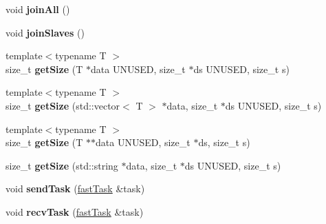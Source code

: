 \begin{DoxyCompactItemize}
\item 
\hypertarget{classfaster_1_1fastComm_aac7379b26c334d31e856c2e2b8ce2595}{}void {\bfseries join\+All} ()\label{classfaster_1_1fastComm_aac7379b26c334d31e856c2e2b8ce2595}

\item 
\hypertarget{classfaster_1_1fastComm_ac47594d479e9c0bce774644a32c23869}{}void {\bfseries join\+Slaves} ()\label{classfaster_1_1fastComm_ac47594d479e9c0bce774644a32c23869}

\item 
\hypertarget{classfaster_1_1fastComm_a44921f3579aef32a44b2885036cac5d4}{}{\footnotesize template$<$typename T $>$ }\\size\+\_\+t {\bfseries get\+Size} (T $\ast$data U\+N\+U\+S\+E\+D, size\+\_\+t $\ast$ds U\+N\+U\+S\+E\+D, size\+\_\+t s)\label{classfaster_1_1fastComm_a44921f3579aef32a44b2885036cac5d4}

\item 
\hypertarget{classfaster_1_1fastComm_ac71b4eb43829701d26467fb989a23a83}{}{\footnotesize template$<$typename T $>$ }\\size\+\_\+t {\bfseries get\+Size} (std\+::vector$<$ T $>$ $\ast$data, size\+\_\+t $\ast$ds U\+N\+U\+S\+E\+D, size\+\_\+t s)\label{classfaster_1_1fastComm_ac71b4eb43829701d26467fb989a23a83}

\item 
\hypertarget{classfaster_1_1fastComm_acd70265fc24a6ae9c7f9bced7a26c00c}{}{\footnotesize template$<$typename T $>$ }\\size\+\_\+t {\bfseries get\+Size} (T $\ast$$\ast$data U\+N\+U\+S\+E\+D, size\+\_\+t $\ast$ds, size\+\_\+t s)\label{classfaster_1_1fastComm_acd70265fc24a6ae9c7f9bced7a26c00c}

\item 
\hypertarget{classfaster_1_1fastComm_a9244e6467e1882c63669457da4514de9}{}size\+\_\+t {\bfseries get\+Size} (std\+::string $\ast$data, size\+\_\+t $\ast$ds U\+N\+U\+S\+E\+D, size\+\_\+t s)\label{classfaster_1_1fastComm_a9244e6467e1882c63669457da4514de9}

\item 
\hypertarget{classfaster_1_1fastComm_a5d58904aab5cc5517df322ab075d64a6}{}void {\bfseries send\+Task} (\hyperlink{classfaster_1_1fastTask}{fast\+Task} \&task)\label{classfaster_1_1fastComm_a5d58904aab5cc5517df322ab075d64a6}

\item 
\hypertarget{classfaster_1_1fastComm_a21bec386fa7d88f3c74345f63d76112a}{}void {\bfseries recv\+Task} (\hyperlink{classfaster_1_1fastTask}{fast\+Task} \&task)\label{classfaster_1_1fastComm_a21bec386fa7d88f3c74345f63d76112a}


\end{DoxyCompactItemize}
